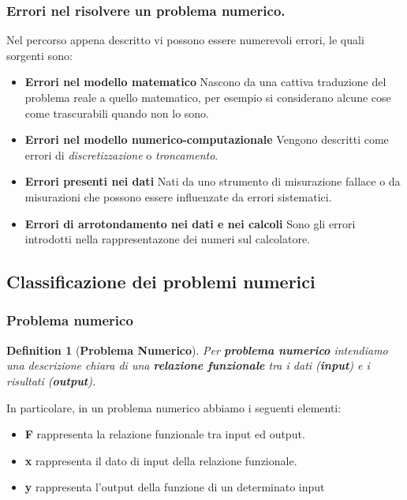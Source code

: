 \documentclass{article}
\newtheorem{definition}{Definition}
\begin{document}
\subsubsection{Errori nel risolvere un problema numerico.}
Nel percorso appena descritto vi possono essere numerevoli errori, 
%
le quali sorgenti sono:
\begin{itemize}
    \item \textbf{Errori nel modello matematico} Nascono da una cattiva 
%
    traduzione del problema reale a quello matematico, per esempio si 
%
    considerano alcune cose come trascurabili quando non lo sono.
    \item \textbf{Errori nel modello numerico-computazionale} Vengono 
%
    descritti come errori di \textit{discretizzazione} o \textit{troncamento}.
    \item \textbf{Errori presenti nei dati} Nati da uno strumento di
%
    misurazione fallace o da misurazioni che possono essere influenzate
%
    da errori sistematici.
    \item \textbf{Errori di arrotondamento nei dati e nei calcoli} Sono 
%
    gli errori introdotti nella rappresentazone dei numeri sul calcolatore.
\end{itemize}
\newpage
\subsection{Classificazione dei problemi numerici}
\subsubsection{Problema numerico}
\begin{definition}[\textbf{Problema Numerico}] Per \textbf{problema numerico}
%
    intendiamo una descrizione chiara di una \textbf{relazione funzionale}  
%
    tra i dati (\textbf{input}) e i risultati (\textbf{output}).
\end{definition}
In particolare, in un problema numerico abbiamo i seguenti elementi:
\begin{itemize}
    \item \textbf{F} rappresenta la relazione funzionale tra input ed output.
    \item \textbf{x} rappresenta il dato di input della relazione funzionale.
    \item \textbf{y} rappresenta l’output della funzione di un determinato input
\end{itemize}
\end{document}
